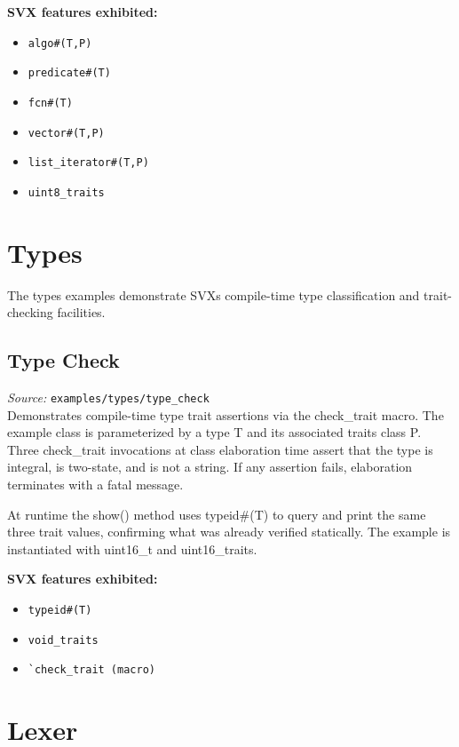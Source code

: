 \documentclass[11pt,letterpaper]{report}
\begin{document}
\textbf{SVX features exhibited:}

\begin{itemize}
  \item \texttt{algo\#(T,P)}
  \item \texttt{predicate\#(T)}
  \item \texttt{fcn\#(T)}
  \item \texttt{vector\#(T,P)}
  \item \texttt{list\_iterator\#(T,P)}
  \item \texttt{uint8\_traits}
\end{itemize}
\chapter{Types}

The types examples demonstrate SVX\textquotesingle s compile-time type classification and trait-checking facilities.

\section{Type Check}

\textit{Source:} \texttt{examples/types/type\_check}\\

Demonstrates compile-time type trait assertions via the check\_trait macro. The example class is parameterized by a type T and its associated traits class P. Three check\_trait invocations at class elaboration time assert that the type is integral, is two-state, and is not a string. If any assertion fails, elaboration terminates with a fatal message.

At runtime the show() method uses typeid\#(T) to query and print the same three trait values, confirming what was already verified statically. The example is instantiated with uint16\_t and uint16\_traits.

\textbf{SVX features exhibited:}

\begin{itemize}
  \item \texttt{typeid\#(T)}
  \item \texttt{void\_traits}
  \item \texttt{\texttt{\`{}check\_trait}\ (macro)}
\end{itemize}
\chapter{Lexer}
\end{document}
